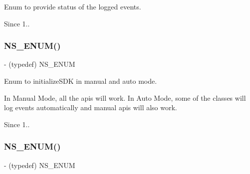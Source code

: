 Enum to provide status of the logged events. 

\begin{DoxySince}{Since}
1.. 
\end{DoxySince}
\mbox{\label{interface_n_f_logger_ae7d5d1604436c440bd209346ff72e85f}} 
\subsubsection{\texorpdfstring{N\+S\+\_\+\+E\+N\+U\+M()}{NS\_ENUM()}\hspace{0.1cm}{\footnotesize\ttfamily [2/3]}}
{\footnotesize\ttfamily -\/ (typedef) N\+S\+\_\+\+E\+N\+UM \begin{DoxyParamCaption}\item[{(N\+S\+U\+Integer)}]{ }\item[{(N\+F\+L\+O\+G\+M\+O\+DE)}]{ }\end{DoxyParamCaption}}



Enum to initialize\+S\+DK in manual and auto mode. 

In Manual Mode, all the apis will work. In Auto Mode, some of the classes will log events automatically and manual apis will also work.

\begin{DoxySince}{Since}
1.. 
\end{DoxySince}
\mbox{\label{interface_n_f_logger_aa59e1d712c8479701815743004967132}} 
\subsubsection{\texorpdfstring{N\+S\+\_\+\+E\+N\+U\+M()}{NS\_ENUM()}\hspace{0.1cm}{\footnotesize\ttfamily [3/3]}}
{\footnotesize\ttfamily -\/ (typedef) N\+S\+\_\+\+E\+N\+UM \begin{DoxyParamCaption}\item[{(N\+S\+Integer)}]{ }\item[{(N\+F\+Log\+Level)}]{ }\end{DoxyParamCaption}}



